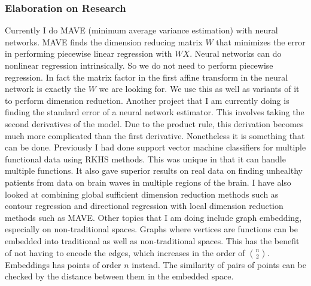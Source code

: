 \documentclass[utf8,letterpaper,oneside]{article}
\begin{document}
\subsubsection*{Elaboration on Research}
Currently I do MAVE (minimum average variance estimation) with neural networks. MAVE finds the dimension reducing matrix $W$ that minimizes the error in performing piecewise linear regression with $WX$. Neural networks can do nonlinear regression intrinsically. So we do not need to perform piecewise regression. In fact the matrix factor in the first affine transform in the neural network is exactly the $W$ we are looking for. We use this as well as variants of it to perform dimension reduction. Another project that I am currently doing is finding the standard error of a neural network estimator. This involves taking the second derivatives of the model. Due to the product rule, this derivation becomes much more complicated than the first derivative. Nonetheless it is something that can be done. Previously I had done support vector machine classifiers for multiple functional data using RKHS methods. This was unique in that it can handle multiple functions. It also gave superior results on real data on finding unhealthy patients from data on brain waves in multiple regions of the brain. I have also looked at combining global sufficient dimension reduction methods such as contour regression and directional regression with local dimension reduction methods such as MAVE. Other topics that I am doing include graph embedding, especially on non-traditional spaces. Graphs where vertices are functions can be embedded into traditional as well as non-traditional spaces. This has the benefit of not having to encode the edges, which increases in the order of $n \choose 2$. Embeddings has points of order $n$ instead. The similarity of pairs of points can be checked by the distance between them in the embedded space.
\end{document}
